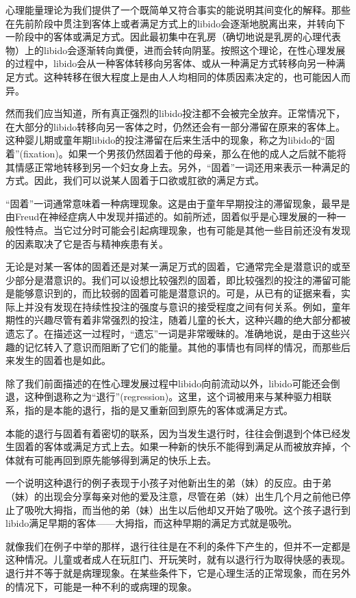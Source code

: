 \documentclass[UTF8,10pt,a4paper,openany]{book}
\begin{document}
心理能量理论为我们提供了一个既简单又符合事实的能说明其间变化的解释。那些在先前阶段中贯注到客体上或者满足方式上的libido会逐渐地脱离出来，并转向下一阶段中的客体或满足方式。因此最初集中在乳房（确切地说是乳房的心理代表物）上的libido会逐渐转向粪便，进而会转向阴茎。按照这个理论，在性心理发展的过程中，libido会从一种客体转移向另客体、或从一种满足方式转移向另一种满足方式。这种转移在很大程度上是由人人均相同的体质因素决定的，也可能因人而异。

然而我们应当知道，所有真正强烈的libido投注都不会被完全放弃。正常情况下，在大部分的libido转移向另一客体之时，仍然还会有一部分滞留在原来的客体上。这种婴儿期或童年期libido的投注滞留在后来生活中的现象，称之为libido的“固着”(fixation)。如果一个男孩仍然固着于他的母亲，那么在他的成人之后就不能将其情感正常地转移到另一个妇女身上去。另外，“固着”一词还用来表示一种满足的方式。因此，我们可以说某人固着于口欲或肛欲的满足方式。

“固着”一词通常意味着一种病理现象。这是由于童年早期投注的滞留现象，最早是由Freud在神经症病人中发现并描述的。如前所述，固着似乎是心理发展的一种一般性特点。当它过分时可能会引起病理现象，也有可能是其他一些目前还没有发现的因素取决了它是否与精神疾患有关。

无论是对某一客体的固着还是对某一满足万式的固着，它通常完全是潜意识的或至少部分是潜意识的。我们可以设想比较强烈的固着，即比较强烈的投注的滞留可能是能够意识到的，而比较弱的固着可能是潜意识的。可是，从已有的证据来看，实际上并没有发现在持续性投注的强度与意识的接受程度之间有何关系。例如，童年期性的兴趣尽管有着非常强烈的投注，随着儿童的长大，这种兴趣的绝大部分都被遗忘了。在描述这一过程时，“遗忘”一词是非常暧昧的。准确地说，是由于这些兴趣的记忆转入了意识而阻断了它们的能量。其他的事情也有同样的情况，而那些后来发生的固着也是如此。

除了我们前面描述的在性心理发展过程中libido向前流动以外，libido可能还会倒退，这种倒退称之为“退行”(regression)。这里，这个词被用来与某种驱力相联系，指的是本能的退行，指的是又重新回到原先的客体或满足方式。

本能的退行与固着有着密切的联系，因为当发生退行时，往往会倒退到个体已经发生固着的客体或满足方式上去。如果一种新的快乐不能得到满足从而被放弃掉，个体就有可能再回到原先能够得到满足的快乐上去。

一个说明这种退行的例子表现于小孩子对他新出生的弟（妹）的反应。由于弟（妹）的出现会分享每亲对他的爱及注意，尽管在弟（妹）出生几个月之前他已停止了吸吮大拇指，而当他的弟（妹）出生以后他却又开始了吸吮。这个孩子退行到libido满足早期的客体——大拇指，而这种早期的满足方式就是吸吮。

就像我们在例子中举的那样，退行往往是在不利的条件下产生的，但并不一定都是这种情况。儿童或者成人在玩肛门、开玩笑时，就有以退行行为取得快感的表现。退行并不等于就是病理现象。在某些条件下，它是心理生活的正常现象，而在另外的情况下，可能是一种不利的或病理的现象。
\end{document}
